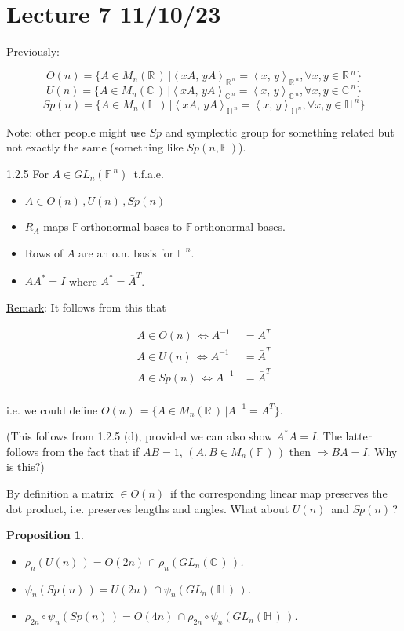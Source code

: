 \documentclass[12pt,a4paper]{article}
\newcommand{\rR}{\ensuremath{\mathbb{R}\,}}
\newcommand{\cC}{\ensuremath{\mathbb{C}\,}}
\newcommand{\hH}{\ensuremath{\mathbb{H}\,}}
\newcommand{\fF}{\ensuremath{\mathbb{F}\,}}
\newcommand{\mnr}{\ensuremath{M_n(\rR)\,}}
\newcommand{\mnc}{\ensuremath{M_n(\cC)\,}}
\newcommand{\mnh}{\ensuremath{M_n(\hH)\,}}
\newcommand{\mnf}{\ensuremath{M_n(\fF)\,}}
\newcommand{\glnc}{\ensuremath{GL_n(\cC)\,}}
\newcommand{\glnh}{\ensuremath{GL_n(\hH)\,}}
\newcommand{\glnf}{\ensuremath{GL_n(\fF^n)\,}}
\newcommand{\gon}{\ensuremath{O(n)\,}}
\newcommand{\gun}{\ensuremath{U(n)\,}}
\newcommand{\gspn}{\ensuremath{Sp(n)\,}}
\newcommand{\gok}[1]{\ensuremath{O(#1)\,}}
\newcommand{\guk}[1]{\ensuremath{U(#1)\,}}
\newcommand{\ra}{\ensuremath{\Rightarrow}}
\newcommand{\ipm}[2]{\ensuremath{\left\langle #1, \, #2 \right\rangle}}
\newcommand{\ul}[1]{\underline{#1}}
\newtheorem{prop}[thm]{Proposition}
\begin{document}
\section{Lecture 7 11/10/23}

\ul{Previously}:

\[O(n)=\{A\in \mnr | \ipm{xA}{yA}_{\rR^{n}}=\ipm{x}{y}_{\rR^{n}}, \forall x,y \in \rR^n\}\]
\[U(n)=\{A\in \mnc | \ipm{xA}{yA}_{\cC^{n}}=\ipm{x}{y}_{\cC^{n}}, \forall x,y \in \cC^n\}\]
\[Sp(n)=\{A\in \mnh | \ipm{xA}{yA}_{\hH^{n}}=\ipm{x}{y}_{\hH^{n}}, \forall x,y \in \hH^n\}\]

Note: other people might use $Sp$ and symplectic group for something related but not exactly the same (something like $Sp(n,\fF)$).

1.2.5 For $A \in \glnf$ t.f.a.e.

\begin{itemize}
\item[a)] $A\in \gon, \gun, \gspn$
\item[b)] $R_A$ maps \fF orthonormal bases to \fF orthonormal bases.
\item[c)] Rows of $A$ are an o.n. basis for $\fF^n$.
\item[d)] $AA^*=I$ where $A^*=\bar{A}^T$.
\end{itemize}

\ul{Remark}: It follows from this that

\begin{align*}
A\in \gon \iff A^{-1}&=A^T\\
A\in \gun \iff A^{-1}&=\bar{A}^T\\
A\in \gspn \iff A^{-1}&=\bar{A}^T\\
\end{align*}

i.e. we could define $\gon =\{A\in \mnr | A^{-1}=A^T\}$. 

(This follows from 1.2.5 (d), provided we can also show $A^*A=I$. The latter follows from the fact that if $AB=1$, $(A,B\in \mnf)$ then \ra $BA=I$. Why is this?)

By definition a matrix $\in \gon$ if the corresponding linear map preserves the dot product, i.e. preserves lengths and angles. What about $\gun$ and $\gspn$?

\begin{prop}
\phantom{a}\\
\begin{itemize}
\item[1)] $\rho_n(\gun)=\gok{2n}\cap \rho_n(\glnc)$.
\item[2)] $\psi_n(\gspn)=\guk{2n}\cap \psi_n(\glnh)$.
\item[3)] $\rho_{2n}\circ \psi_n(\gspn)=\gok{4n}\cap \rho_{2n}\circ\psi_n(\glnh)$.
\end{itemize}
\end{prop}
\end{document}

